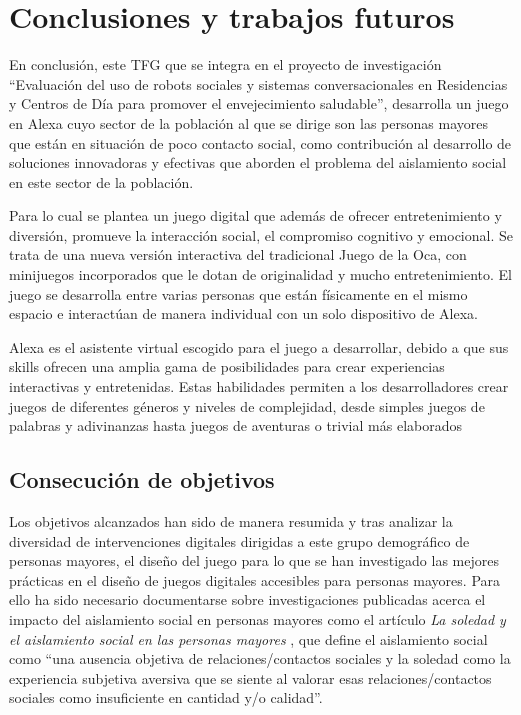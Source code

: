 \section{Conclusiones y trabajos futuros}

En conclusión, este TFG que se integra en el proyecto de investigación \enquote{Evaluación del uso de robots sociales y sistemas conversacionales en Residencias y Centros de Día para promover el envejecimiento saludable}, desarrolla un juego en Alexa cuyo sector de la población al que se dirige son las personas mayores que están en situación de poco contacto social, como contribución al desarrollo de soluciones innovadoras y efectivas que aborden el problema del aislamiento social en este sector de la población.

Para lo cual se plantea un juego digital que además de ofrecer entretenimiento y diversión, promueve la interacción social, el compromiso cognitivo y emocional. Se trata de una nueva versión interactiva del tradicional Juego de la Oca, con minijuegos incorporados que le dotan de originalidad y mucho entretenimiento. El juego se desarrolla entre varias personas que están físicamente en el mismo espacio e interactúan de manera individual con un solo dispositivo de Alexa.

Alexa es el asistente virtual escogido para el juego a desarrollar, debido a que sus skills ofrecen una amplia gama de posibilidades para crear experiencias interactivas y entretenidas. Estas habilidades permiten a los desarrolladores crear juegos de diferentes géneros y niveles de complejidad, desde simples juegos de palabras y adivinanzas hasta juegos de aventuras o trivial más elaborados

\subsection{Consecución de objetivos}

Los objetivos alcanzados han sido de manera resumida y tras analizar la diversidad de intervenciones digitales dirigidas a este grupo demográfico de personas mayores, el diseño del juego para lo que se han investigado las mejores prácticas en el diseño de juegos digitales accesibles para personas mayores. Para ello ha sido necesario documentarse sobre investigaciones publicadas acerca el impacto del aislamiento social en personas mayores como el artículo \textit{La soledad y el aislamiento social en las personas mayores} \parencite{ArruebarrenaCabaco2020}, que define el aislamiento social como \enquote{una ausencia objetiva de relaciones/contactos sociales y la soledad como la experiencia subjetiva aversiva que se siente al valorar esas relaciones/contactos sociales como insuficiente en cantidad y/o calidad}.


